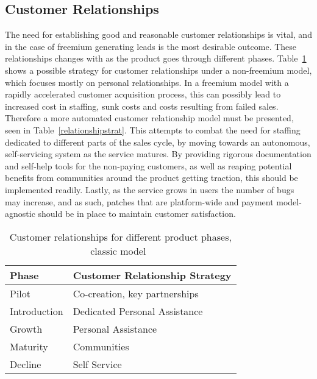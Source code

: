 \subsection{Customer Relationships}
The need for establishing good and reasonable customer relationships is vital, and in the case of freemium generating leads is the most desirable outcome. These relationships changes with as the product goes through different phases. Table~\ref{classiccr} shows a possible strategy for customer relationships under a non-freemium model, which focuses mostly on personal relationships. In a freemium model with a rapidly accelerated customer acquisition process, this can possibly lead to increased cost in staffing, sunk costs and costs resulting from failed sales. Therefore a more automated customer relationship model must be presented, seen in Table~\ref{relationshipstrat}. This attempts to combat the need for staffing dedicated to different parts of the sales cycle, by moving towards an autonomous, self-servicing system as the service matures. By providing rigorous documentation and self-help tools for the non-paying customers, as well as reaping potential benefits from communities around the product getting traction, this should be implemented readily. Lastly, as the service grows in users the number of bugs may increase, and as such, patches that are platform-wide and payment model-agnostic should be in place to maintain customer satisfaction.

\begin{table}[]
\centering
\caption{Customer relationships for different product phases, classic model~\cite{karlbernhoffbinde2015}}
\label{classiccr}
\begin{tabular}{|l|l|}
\hline
\textbf{Phase} & \textbf{Customer Relationship Strategy} \\ \hline
Pilot          & Co-creation, key partnerships           \\ \hline
Introduction   & Dedicated Personal Assistance           \\ \hline
Growth         & Personal Assistance                     \\ \hline
Maturity       & Communities                             \\ \hline
Decline        & Self Service                            \\ \hline
\end{tabular}
\end{table}


